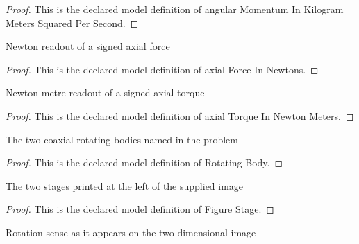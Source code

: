 \begin{proof}
  This is the declared model definition of angular Momentum In Kilogram Meters Squared Per Second.
\end{proof}
\begin{definition}
  \label{def:physics:phyx-mini-0826:phyxminiproblems-problemphyxmini0826-axialforceinnewtons}
  Newton readout of a signed axial force
\end{definition}
\begin{proof}
  This is the declared model definition of axial Force In Newtons.
\end{proof}
\begin{definition}
  \label{def:physics:phyx-mini-0826:phyxminiproblems-problemphyxmini0826-axialtorqueinnewtonmeters}
  Newton-metre readout of a signed axial torque
\end{definition}
\begin{proof}
  This is the declared model definition of axial Torque In Newton Meters.
\end{proof}
\begin{definition}
  \label{def:physics:phyx-mini-0826:phyxminiproblems-problemphyxmini0826-rotatingbody}
  The two coaxial rotating bodies named in the problem
\end{definition}
\begin{proof}
  This is the declared model definition of Rotating Body.
\end{proof}
\begin{definition}
  \label{def:physics:phyx-mini-0826:phyxminiproblems-problemphyxmini0826-figurestage}
  The two stages printed at the left of the supplied image
\end{definition}
\begin{proof}
  This is the declared model definition of Figure Stage.
\end{proof}
\begin{definition}
  \label{def:physics:phyx-mini-0826:phyxminiproblems-problemphyxmini0826-screenrotationsense}
  Rotation sense as it appears on the two-dimensional image
\end{definition}
